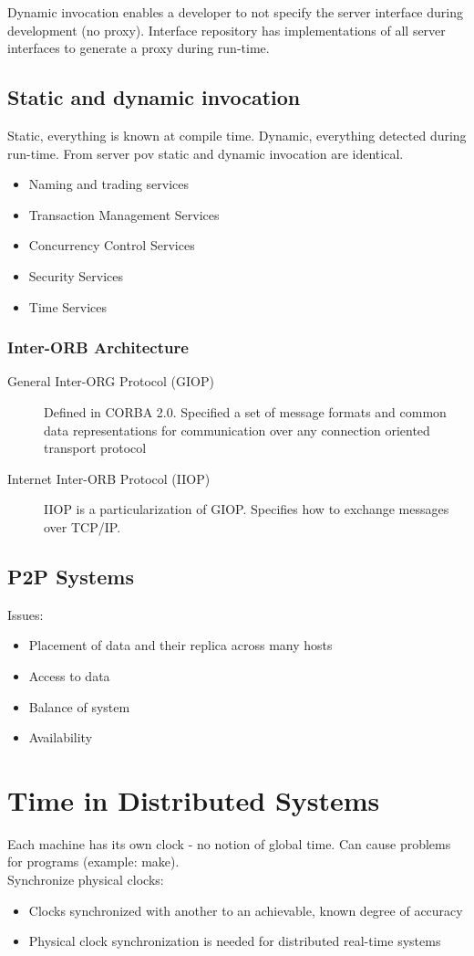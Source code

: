 \documentclass[a4paper]{article}
\begin{document}
Dynamic invocation enables a developer to not specify the server interface
during development (no proxy). Interface repository has implementations of all
server interfaces to generate a proxy during run-time.
\subsection{Static and dynamic invocation}
Static, everything is known at compile time. Dynamic, everything detected during
run-time. From server pov static and dynamic invocation are identical.
\begin{itemize}
	\item Naming and trading services
	\item Transaction Management Services
	\item Concurrency Control Services
	\item Security Services
	\item Time Services
\end{itemize}
\subsubsection{Inter-ORB Architecture}
\begin{description}
	\item[General Inter-ORG Protocol (GIOP)] Defined in CORBA 2.0. Specified
		a set of message formats and common data representations for
		communication over any connection oriented transport protocol
	\item[Internet Inter-ORB Protocol (IIOP)] IIOP is a particularization of
		GIOP. Specifies how to exchange messages over TCP/IP.
\end{description}

\subsection{P2P Systems}
Issues:
\begin{itemize}
	\item Placement of data and their replica across many hosts
	\item Access to data
	\item Balance of system
	\item Availability
\end{itemize}
\section{Time in Distributed Systems}
Each machine has its own clock - no notion of global time. Can cause problems
for programs (example: make).\\
Synchronize physical clocks:
\begin{itemize}
	\item Clocks synchronized with another to an achievable, known degree of
		accuracy
	\item Physical clock synchronization is needed for distributed real-time
		systems
\end{itemize}
\end{document}
